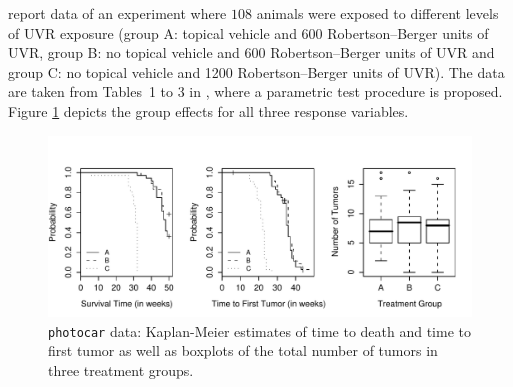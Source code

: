 \documentclass{article}
\newcommand{\Robject}[1]{\texttt{#1}}
\begin{document}
\cite{Molefeetal2005} report data of an experiment where
$108$ animals were exposed to different levels 
of UVR exposure (group A: topical vehicle and 600 Robertson--Berger units 
of UVR, group B: no topical vehicle and 600 Robertson--Berger units of UVR and group C: 
no topical vehicle and 1200 Robertson--Berger units of UVR). 
The data are taken from Tables~1 to 3 in \cite{Molefeetal2005}, where a 
parametric test procedure is proposed. Figure
\ref{photocarfig} depicts the group effects for all three response
variables. 


\begin{figure}
\begin{center}
\includegraphics{LegoCondInf-photocar-plot}
\caption{\Robject{photocar} data: 
         Kaplan-Meier estimates of time to death and time to first tumor as
         well as boxplots of the total number of tumors in three treatment
         groups. \label{photocarfig}}
\end{center}
\end{figure}
\end{document}
